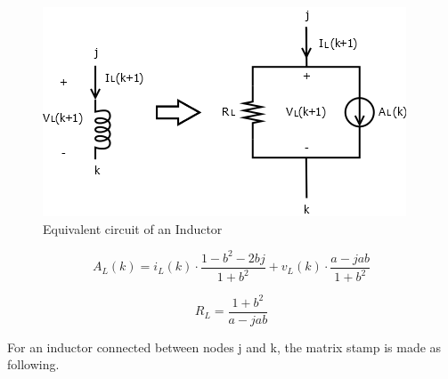 \begin{figure}[ht]
	\centering
	\includegraphics[scale=0.6]{img/Inductor.png} 
	\caption{Equivalent circuit of an Inductor}
	\label{fig:Inductor}
\end{figure}

 
\begin{equation} \label{eq:AL}
	A_L(k) = i_L(k) \cdot \frac{1-b^2-2bj}{1+b^2} + v_L(k) \cdot \frac{a-jab}{1+b^2}
\end{equation}

\begin{equation}
	R_L = \frac{1+b^2}{a-jab}
\end{equation}	

For an inductor connected between nodes j and k, the matrix stamp is made as following.

